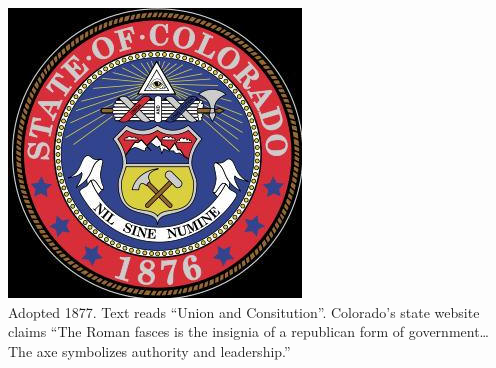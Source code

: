 \begin{frame}
    \centering
    \includegraphics[height=.8\textheight]{img/fasces/fasces13.jpg} \\
    Adopted 1877. Text reads ``Union and Consitution''. Colorado's state website claims ``The Roman fasces is the insignia of a republican form of government\ldots The axe symbolizes authority and leadership.'' \\
\end{frame}


